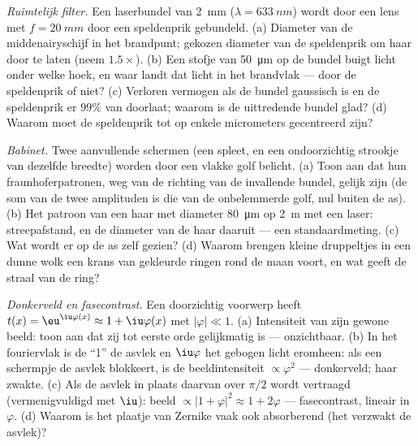 \begin{exercise}[$\star\star$]\label{exo:b2:diffraction:9}
\emph{Ruimtelijk filter.} Een laserbundel van \qty{2}{mm}
($\lambda = \qty{633}{nm}$) wordt
door een lens met $f = \qty{20}{mm}$ door een speldenprik gebundeld. (a)
Diameter van
de middenairyschijf in het brandpunt; gekozen diameter van de speldenprik om
haar door te laten
(neem $1.5\times$). (b) Een stofje van \qty{50}{\micro m} op de bundel
buigt licht onder welke hoek, en waar landt dat licht in het
brandvlak --- door de speldenprik of niet? (c) Verloren vermogen als de bundel
gaussisch is en de speldenprik er $99\%$ van doorlaat; waarom is de uittredende
bundel glad? (d) Waarom moet de speldenprik tot op enkele
micrometers gecentreerd zijn?
\end{exercise}

\begin{exercise}[$\star\star\star$]\label{exo:b2:diffraction:10}
\emph{Babinet.} Twee aanvullende schermen (een spleet, en een ondoorzichtig
strookje van dezelfde breedte) worden door een vlakke golf belicht. (a) Toon
aan dat hun
fraunhoferpatronen, weg van de richting van de invallende bundel,
gelijk zijn (de som van de twee amplituden is die van de
onbelemmerde golf, nul buiten de as). (b) Het patroon van een haar met
diameter \qty{80}{\micro m} op \qty{2}{m} met een laser: streepafstand, en de
diameter van de haar daaruit --- een standaardmeting. (c) Wat wordt er
op de as zelf gezien? (d) Waarom brengen kleine druppeltjes in een dunne wolk een
krans van gekleurde ringen rond de maan voort, en wat geeft de straal van de
ring?
\end{exercise}

\begin{exercise}[$\star\star\star$]\label{exo:b2:diffraction:11}
\emph{Donkerveld en fasecontrast.} Een doorzichtig voorwerp heeft
$t(x) = \eu^{\iu\varphi(x)} \approx 1 + \iu\varphi(x)$ met
$|\varphi| \ll 1$. (a) Intensiteit van
zijn gewone beeld: toon aan dat zij tot eerste orde gelijkmatig is ---
onzichtbaar. (b)
In het fouriervlak is de ``1'' de asvlek en $\iu\varphi$ het
gebogen licht eromheen: als een schermpje de asvlek blokkeert, is de
beeldintensiteit $\propto\varphi^2$ --- donkerveld; haar zwakte. (c) Als de
asvlek in plaats daarvan over $\pi/2$ wordt vertraagd (vermenigvuldigd met
$\iu$): beeld $\propto|1 +
\varphi|^2 \approx 1 + 2\varphi$ ---
fasecontrast, lineair in $\varphi$. (d) Waarom is het
plaatje van Zernike vaak ook absorberend (het verzwakt de asvlek)?
\end{exercise}

